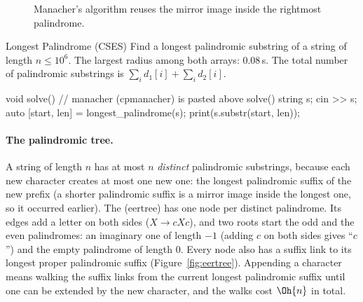 \begin{figure}[htbp]
\centering
{}
\caption{Manacher's algorithm reuses the mirror image inside the rightmost palindrome.}
\label{fig:manacher}
\end{figure}


\begin{problem}{Longest Palindrome (CSES)}
Find a longest palindromic substring of a string of length $n \le 10^6$.
\solution The largest radius among both arrays: 0.08\,s. The total number of palindromic substrings is $\sum_i d_1[i] + \sum_i d_2[i]$.
\end{problem}

\begin{code}
void solve() {  // manacher (cpmanacher) is pasted above solve()
    string s;
    cin >> s;
    auto [start, len] = longest_palindrome(s);
    print(s.substr(start, len));
}
\end{code}

\paragraph{The palindromic tree.} A string of length $n$ has at most $n$ \emph{distinct} palindromic substrings, because each new character
creates at most one new one: the longest palindromic suffix of the new prefix (a shorter palindromic suffix is a mirror image inside the
longest one, so it occurred earlier). The  (eertree) has one node per distinct palindrome. Its edges add a letter on
both sides ($X \to cXc$), and two roots start the odd and the even palindromes: an imaginary one of length $-1$ (adding $c$ on both
sides gives ``$c$'') and the empty palindrome of length 0. Every node also has a suffix link to its longest proper palindromic suffix
(Figure~\ref{fig:eertree}). Appending a character means walking the suffix links from the current longest palindromic suffix until one
can be extended by the new character, and the walks cost $\Oh{n}$ in total.

